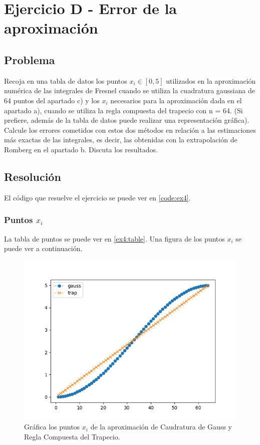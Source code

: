 \section{Ejercicio D - Error de la aproximación}

\subsection{Problema}

Recoja en una tabla de datos los puntos $x_i \in [0, 5]$ utilizados en la aproximación numérica de las integrales de Fresnel cuando se utiliza la cuadratura gaussiana de 64 puntos del apartado c) y los $x_i$ necesarios para la aproximación dada en el apartado a), cuando se utiliza la regla compuesta del trapecio con n = 64. (Si prefiere, además de la tabla de datos puede realizar una representación gráfica). Calcule los errores cometidos con estos dos métodos en relación a las estimaciones más exactas de las integrales, es decir, las obtenidas con la extrapolación de Romberg en el apartado b. Discuta los resultados.

\subsection{Resolución}


El código que resuelve el ejercicio se puede ver en \ref{code:ex4}. 

\subsubsection{Puntos $x_i$}

La tabla de puntos se puede ver en \ref{ex4:table}. Una figura de los puntos $x_i$ se puede ver a continuación. 

\begin{figure}[h!]
	\centering
	\includegraphics[width=0.8\linewidth]{figures/gauss_trap_xi.png}
	\caption{Gráfica los puntos $x_i$ de la aproximación de Caudratura de Gauss y Regla Compuesta del Trapecio.}
	\label{fig:gauss_trap_xi}
\end{figure}

